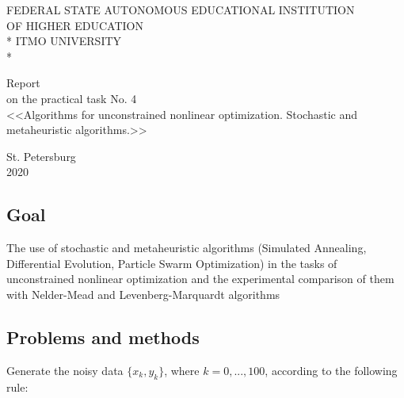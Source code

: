\documentclass{article}
\begin{document}
\newpage
\begin{titlepage}

\begin{center}\large{
    FEDERAL STATE AUTONOMOUS EDUCATIONAL INSTITUTION \\
    OF HIGHER EDUCATION \\*
    ITMO UNIVERSITY \\*
}\end{center}

\vspace{12em}

\begin{center}\large{
    Report \\
    on the practical task No. 4 \\
    <<Algorithms for unconstrained nonlinear optimization. Stochastic and
metaheuristic algorithms.>>
}\end{center}

\vspace{8.5em}

\vspace{1.5em}

\vspace{\fill}

\begin{center}
    St. Petersburg \\
    2020
\end{center}

\end{titlepage}

\newpage
\subsection*{Goal}

The use of stochastic and metaheuristic algorithms (Simulated Annealing,
Differential Evolution, Particle Swarm Optimization) in the tasks of unconstrained
nonlinear optimization and the experimental comparison of them with Nelder-Mead
and Levenberg-Marquardt algorithms

\subsection*{Problems and methods}

Generate the noisy data $\{x_k, y_k\}$, where $k = 0, ..., 100$, according to the following rule:
\end{document}
